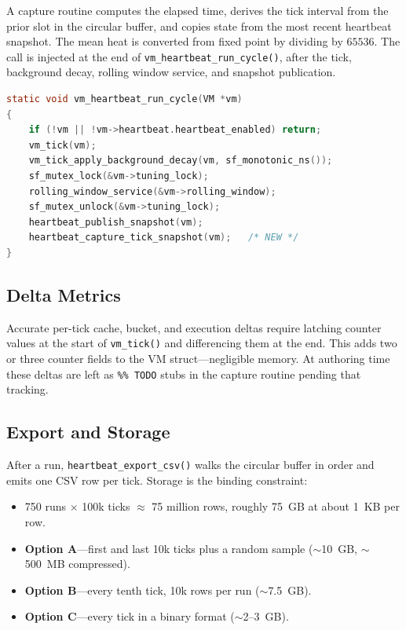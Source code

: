 A capture routine computes the elapsed time, derives the tick interval from the
prior slot in the circular buffer, and copies state from the most recent
heartbeat snapshot. The mean heat is converted from \Qtype{} fixed point by
dividing by $65536$. The call is injected at the end of
\lstinline{vm_heartbeat_run_cycle()}, after the tick, background decay, rolling
window service, and snapshot publication.

\begin{lstlisting}[language=C]
static void vm_heartbeat_run_cycle(VM *vm)
{
    if (!vm || !vm->heartbeat.heartbeat_enabled) return;
    vm_tick(vm);
    vm_tick_apply_background_decay(vm, sf_monotonic_ns());
    sf_mutex_lock(&vm->tuning_lock);
    rolling_window_service(&vm->rolling_window);
    sf_mutex_unlock(&vm->tuning_lock);
    heartbeat_publish_snapshot(vm);
    heartbeat_capture_tick_snapshot(vm);   /* NEW */
}
\end{lstlisting}

\subsection{Delta Metrics}

Accurate per-tick cache, bucket, and execution deltas require latching counter
values at the start of \lstinline{vm_tick()} and differencing them at the end.
This adds two or three counter fields to the VM struct---negligible memory.
At authoring time these deltas are left as \lstinline{%% TODO} stubs in the
capture routine pending that tracking.

\subsection{Export and Storage}

After a run, \lstinline{heartbeat_export_csv()} walks the circular buffer in
order and emits one CSV row per tick. Storage is the binding constraint:

\begin{itemize}
  \item 750 runs $\times$ 100k ticks $\approx$ 75 million rows, roughly 75~GB at
        about 1~KB per row.
  \item \textbf{Option A}---first and last 10k ticks plus a random sample
        ($\sim$10~GB, $\sim$500~MB compressed).
  \item \textbf{Option B}---every tenth tick, 10k rows per run ($\sim$7.5~GB).
  \item \textbf{Option C}---every tick in a binary format ($\sim$2--3~GB).
\end{itemize}

